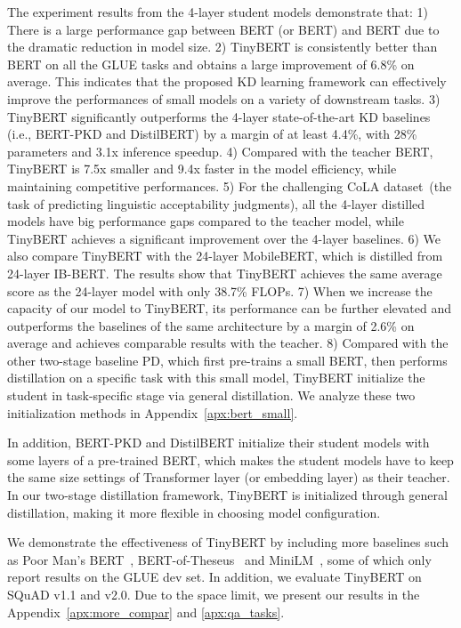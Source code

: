 \documentclass[11pt,a4paper]{article}
\begin{document}
The experiment results from the 4-layer student models demonstrate that: 1) There is a large performance gap between BERT (or BERT) and BERT due to the dramatic reduction in model size. 2) TinyBERT is consistently better than BERT on all the GLUE tasks and obtains a large improvement of 6.8\% on average. This indicates that the proposed KD learning framework can effectively improve the performances of small models on a variety of downstream tasks. 3) TinyBERT significantly outperforms the 4-layer state-of-the-art KD baselines (i.e., BERT-PKD and DistilBERT) by a margin of at least 4.4\%, with 28\% parameters and 3.1x inference speedup. 4) Compared with the teacher BERT, TinyBERT is 7.5x smaller and 9.4x faster in the model efficiency, while maintaining competitive performances. 5) For the challenging CoLA dataset~(the task of predicting linguistic acceptability judgments), all the 4-layer distilled models have big performance gaps compared to the teacher model, while TinyBERT achieves a significant improvement over the 4-layer baselines. 6) We also compare TinyBERT with the 24-layer MobileBERT, which is distilled from 24-layer IB-BERT. The results show that TinyBERT achieves the same average score as the 24-layer model with only 38.7\% FLOPs. 7) When we increase the capacity of our model to TinyBERT, its performance can be further elevated and outperforms the baselines of the same architecture by a margin of 2.6\% on average and achieves comparable results with the teacher. 8) Compared with the other two-stage baseline PD, which first pre-trains a small BERT, then performs distillation on a specific task with this small model, TinyBERT initialize the student in task-specific stage via general distillation. We analyze these two initialization methods in Appendix~\ref{apx:bert_small}.

In addition, BERT-PKD and DistilBERT initialize their student models with some layers of a pre-trained BERT, which makes the student models have to keep the same size settings of Transformer layer (or embedding layer) as their teacher. In our two-stage distillation framework, TinyBERT is initialized through general distillation, making it more flexible in choosing model configuration.

 We demonstrate the effectiveness of TinyBERT by including more baselines such as Poor Man’s BERT~\cite{sajjad2020poor}, BERT-of-Theseus~\cite{xu2020bert} and MiniLM~\cite{wang2020minilm}, some of which only report results on the GLUE dev set. In addition, we evaluate TinyBERT on SQuAD v1.1 and v2.0. Due to the space limit, we present our results in the Appendix~\ref{apx:more_compar} and \ref{apx:qa_tasks}. 
\end{document}
